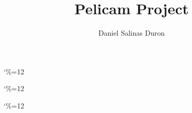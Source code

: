 \documentclass{tufte-book}
\title{Pelicam Project}
\author{Daniel Salinas Duron}
\begin{document}
\maketitle 

\frontmatter


{\catcode`\%=12 }

{\catcode`\%=12 }

{\catcode`\%=12 }



\end{document}
